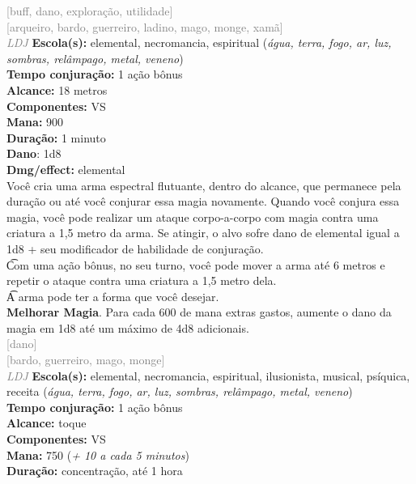 \documentclass{RPG_Adventure}[2021/10/20]
\begin{document}
{\scriptsize \textcolor{gray}{[buff, dano, exploração, utilidade]\\}}
{\scriptsize \textcolor{gray}{[arqueiro, bardo, guerreiro, ladino, mago, monge, xamã]\\}}
{\tiny \textcolor{gray}{\textit{LDJ}}}\jump{}
{\small \t \textbf{Escola(s):} elemental, necromancia, espiritual (\textit{água, terra, fogo, ar, luz, sombras, relâmpago, metal, veneno})\\\t \textbf{Tempo conjuração:} 1 ação bônus\\\t \textbf{Alcance:} 18 metros\\\t \textbf{Componentes:} VS\\\t \textbf{Mana:} 900\\\t \textbf{Duração:} 1 minuto\\\t \textbf{Dano}: 1d8\\\t \textbf{Dmg/effect:} elemental\\}
{\normalsize Você cria uma arma espectral flutuante, dentro do alcance, que permanece pela duração ou até você conjurar essa magia novamente. Quando você conjura essa magia, você pode realizar um ataque corpo-a-corpo com magia contra uma criatura a 1,5 metro da arma. Se atingir, o alvo sofre dano de elemental igual a 1d8 + seu modificador de habilidade de conjuração.\\\t Com uma ação bônus, no seu turno, você pode mover a arma até 6 metros e repetir o ataque contra uma criatura a 1,5 metro dela.\\\t A arma pode ter a forma que você desejar.\\\t \textbf{Melhorar Magia}. Para cada 600 de mana extras gastos, aumente o dano da magia em 1d8 até um máximo de 4d8 adicionais.\\}
{\scriptsize \textcolor{gray}{[dano]\\}}
{\scriptsize \textcolor{gray}{[bardo, guerreiro, mago, monge]\\}}
{\tiny \textcolor{gray}{\textit{LDJ}}}\jump{}
{\small \t \textbf{Escola(s):} elemental, necromancia, espiritual, ilusionista, musical, psíquica, receita (\textit{água, terra, fogo, ar, luz, sombras, relâmpago, metal, veneno})\\\t \textbf{Tempo conjuração:} 1 ação bônus\\\t \textbf{Alcance:} toque\\\t \textbf{Componentes:} VS\\\t \textbf{Mana:} 750 (\textit{+ 10 a cada 5 minutos})\\\t \textbf{Duração:} concentração, até 1 hora\\}
\end{document}
